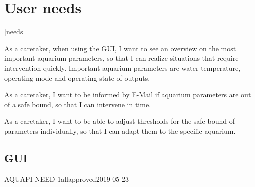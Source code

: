\section{User needs}[needs]



As a caretaker, when using the GUI, I want to see an overview on the most important aquarium parameters, so that I can realize situations that require intervention quickly.
Important aquarium parameters are water temperature, operating mode and operating state of outputs.

As a caretaker, I want to be informed by E-Mail if aquarium parameters are out of a safe bound, so that I can intervene in time.

As a caretaker, I want to be able to adjust thresholds for the safe bound of parameters individually, so that I can adapt them to the specific aquarium.

\subsection{GUI}

\begin{UserNeed}{AQUAPI-NEED-}{1}{all}{approved}{2019-05-23}
\end{UserNeed}
